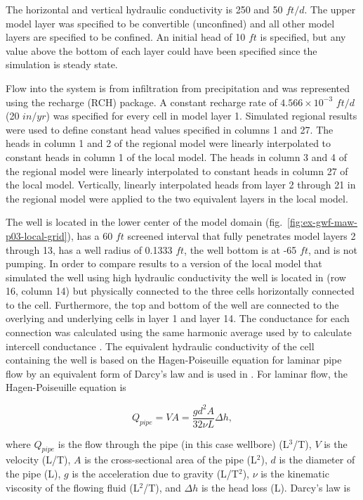The horizontal and vertical hydraulic conductivity is 250 and 50 $ft/d$. The upper model layer was specified to be convertible (unconfined) and all other model layers are specified to be confined. An initial head of 10 $ft$ is specified, but any value above the bottom of each layer could have been specified since the simulation is steady state. 

Flow into the system is from infiltration from precipitation and was represented using the recharge (RCH) package. A constant recharge rate of $4.566 \times 10^{-3}$ $ft/d$ (20 $in/yr$) was specified for every cell in model layer 1. Simulated regional results were used to define constant head values specified in columns 1 and 27. The heads in column 1 and 2 of the regional model were linearly interpolated to constant heads in column 1 of the local model. The heads in column 3 and 4 of the regional model were linearly interpolated to constant heads in column 27 of the local model. Vertically, linearly interpolated heads from layer 2 through 21 in the regional model were applied to the two equivalent layers in the local model.

The well is located in the lower center of the model domain (fig.~\ref{fig:ex-gwf-maw-p03-local-grid}), has a 60 $ft$ screened interval that fully penetrates model layers 2 through 13, has a well radius of 0.1333 $ft$, the well bottom is at -65 $ft$, and is not pumping. In order to compare results to a version of the local model that simulated the well using high hydraulic conductivity the well is located in (row 16, column 14) but physically connected to the three cells horizontally connected to the cell. Furthermore, the top and bottom of the well are connected to the overlying and underlying cells in layer 1 and layer 14. The conductance for each connection was calculated using the same harmonic average used by \mf to calculate intercell conductance \cite[see][eq.4-24]{modflow6gwf}. The equivalent hydraulic conductivity of the cell containing the well is based on the Hagen-Poiseuille equation for laminar pipe flow by an equivalent form of Darcy's law and is used in \mf. For laminar flow, the Hagen-Poiseuille equation is

\begin{equation}
	\label{eq:hagenpoiseuille}
	Q_{pipe} = VA = \frac{g d^{2} A}{32 \nu L} \Delta h,
\end{equation}

\noindent where $Q_{pipe}$ is the flow through the pipe (in this case wellbore) (L$^{3}$/T), $V$ is the velocity (L/T), $A$ is the cross-sectional area of the pipe (L$^{2}$), $d$ is the diameter of the pipe (L), $g$ is the acceleration due to gravity (L/T$^{2}$), $\nu$ is the kinematic viscosity of the flowing fluid (L$^{2}$/T), and $\Delta h$ is the head loss (L). Darcy's law is

